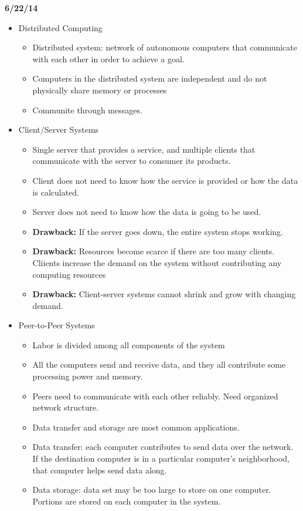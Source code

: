 \documentclass[letterpaper,english,12pt]{article}
\begin{document}
\textbf{6/22/14}
\begin{itemize}
	\item Distributed Computing
		\begin{itemize}
			\item Distributed system: network of autonomous computers that communicate with each other in order to achieve a goal.
			\item Computers in the distributed system are independent and do not physically share memory or processes
			\item Communite through messages.
		\end{itemize}
	\item Client/Server Systems
		\begin{itemize}
			\item Single server that provides a service, and multiple clients that communicate with the server to consumer its products.
			\item Client does not need to know how the service is provided or how the data is calculated.
			\item Server does not need to know how the data is going to be used.
			\item \textbf{Drawback: } If the server goes down, the entire system stops working.
			\item \textbf{Drawback: } Resources become scarce if there are too many clients. Cliients increase the demand on the system without contributing any computing resources
			\item \textbf{Drawback: } Client-server systems cannot shrink and grow with changing demand.
		\end{itemize}
	\item Peer-to-Peer Systems
		\begin{itemize}
			\item Labor is divided among all components of the system
			\item All the computers send and receive data, and they all contribute some processing power and memory.
			\item Peers need to communicate with each other reliably. Need organized network structure.
			\item Data transfer and storage are most common applications.
			\item Data transfer: each computer contributes to send data over the network. If the destination computer is in a particular computer's neighborhood, that computer helps send data along. 
			\item Data storage: data set may be too large to store on one computer. Portions are stored on each computer in the system.

\end{itemize}
\end{itemize}
\end{document}
